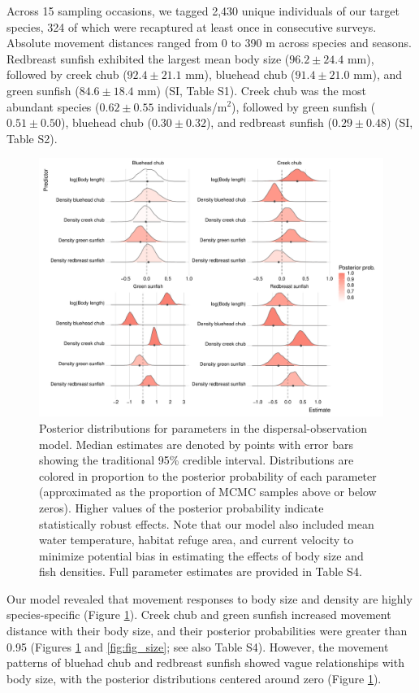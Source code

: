 \documentclass[11pt, class=article, crop=false]{standalone}
\begin{document}
Across 15 sampling occasions, we tagged 2,430 unique individuals of our target species, 324 of which were recaptured at least once in consecutive surveys.  
Absolute movement distances ranged from 0 to 390 m across species and seasons.  
Redbreast sunfish exhibited the largest mean body size ($96.2 \pm 24.4$ mm), followed by creek chub ($92.4 \pm 21.1$ mm), bluehead chub ($91.4 \pm 21.0$ mm), and green sunfish ($84.6 \pm 18.4$ mm) (SI, Table S1).
Creek chub was the most abundant species ($0.62 \pm 0.55$ individuals/m$^2$), followed by green sunfish ($0.51 \pm 0.50$), bluehead chub ($0.30 \pm 0.32$), and redbreast sunfish ($0.29 \pm 0.48$) (SI, Table S2).  

\begin{figure}
    \centering
    \includegraphics[width=0.9\linewidth]{output/fig_est.pdf}
    \caption{Posterior distributions for parameters in the dispersal-observation model. Median estimates are denoted by points with error bars showing the traditional 95\% credible interval. 
    Distributions are colored in proportion to the posterior probability of each parameter (approximated as the proportion of MCMC samples above or below zeros).
    Higher values of the posterior probability indicate statistically robust effects.
    Note that our model also included mean water temperature, habitat refuge area, and current velocity to minimize potential bias in estimating the effects of body size and fish densities.
    Full parameter estimates are provided in Table S4.}
    \label{fig:fig_est}
\end{figure}

Our model revealed that movement responses to body size and density are highly species-specific (Figure \ref{fig:fig_est}). Creek chub and green sunfish increased movement distance with their body size, and their posterior probabilities were greater than 0.95 (Figures \ref{fig:fig_est} and \ref{fig:fig_size}; see also Table S4). 
However, the movement patterns of bluehad chub and redbreast sunfish showed vague relationships with body size, with the posterior distributions centered around zero (Figure \ref{fig:fig_est}).
\end{document}
